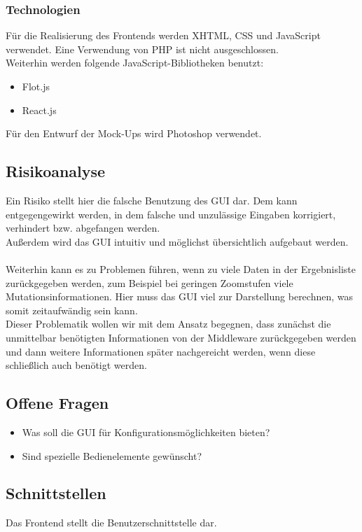 \documentclass{scrartcl}
\begin{document}
\subsubsection{Technologien}
Für die Realisierung des Frontends werden XHTML, CSS und JavaScript verwendet. Eine Verwendung von PHP ist nicht ausgeschlossen.\\
Weiterhin werden folgende JavaScript-Bibliotheken benutzt:
\begin{itemize}
\item Flot.js
\item React.js
\end{itemize}
Für den Entwurf der Mock-Ups wird Photoshop verwendet.
\subsection{Risikoanalyse}
Ein Risiko stellt hier die falsche Benutzung des GUI dar. Dem kann entgegengewirkt werden, in dem falsche und unzulässige Eingaben korrigiert, verhindert bzw. abgefangen werden.\\
Außerdem wird das GUI intuitiv und möglichst übersichtlich aufgebaut werden.\\\\
Weiterhin kann es zu Problemen führen, wenn zu viele Daten in der Ergebnisliste zurückgegeben werden, zum Beispiel bei geringen Zoomstufen viele Mutationsinformationen. Hier muss das GUI viel zur Darstellung berechnen, was somit zeitaufwändig sein kann.\\
Dieser Problematik wollen wir mit dem Ansatz begegnen, dass zunächst die unmittelbar benötigten Informationen von der Middleware zurückgegeben werden und dann weitere Informationen später nachgereicht werden, wenn diese schließlich auch benötigt werden.
\subsection{Offene Fragen}
\begin{itemize}
\item Was soll die GUI für Konfigurationsmöglichkeiten bieten?
\item Sind spezielle Bedienelemente gewünscht?
\end{itemize}
\subsection{Schnittstellen}
Das Frontend stellt die Benutzerschnittstelle dar.
\end{document}
